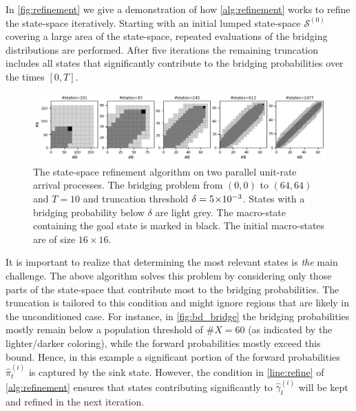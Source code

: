 In \autoref{fig:refinement} we give a demonstration of how
\autoref{alg:refinement} works to refine the state-space
iteratively. Starting with an initial lumped state-space $\mathcal{S}^{(0)}$ covering a large area of the state-space,
repeated evaluations of the bridging distributions are performed.
After five iterations the remaining truncation includes all states
that significantly contribute to the bridging
probabilities over the times $[0,T]$.
\begin{figure}[tb]
    \centering
    \includegraphics[width=\textwidth]{gfx/refinement.png}
	\caption[State-space refinement algorithm on two parallel unit-rate arrival processes]{The state-space refinement algorithm on two parallel unit-rate arrival processes. The bridging problem from $(0,0)$ to $(64, 64)$ and $T=10$ and truncation threshold $\delta= 5\!\times\hspace{-.5ex} 10^{-3} $. States with a bridging probability below $\delta$ are light grey. The macro-state containing the goal state is marked in black. The initial macro-states are of size $16\times 16$.}
    \label{fig:refinement}
\end{figure}

It is important to realize that determining the most relevant states is \emph{the} main challenge.
The above algorithm solves this problem by considering only those parts of the state-space that contribute most to the bridging probabilities.
The truncation is tailored to this condition and might ignore regions that are likely in the unconditioned case.
For instance, in \autoref{fig:bd_bridge} the bridging probabilities mostly remain below a population threshold of $\#X=60$ (as indicated by the lighter/darker coloring), while the forward probabilities mostly exceed this bound. Hence, in this example a significant portion of the forward probabilities $\hat\pi_t^{(i)}$  
 is captured by the sink state. However, the condition in \autoref{line:refine} of \autoref{alg:refinement} ensures that
states contributing significantly to $\hat\gamma_t^{(i)}$ will be kept and refined in the next iteration.
 


